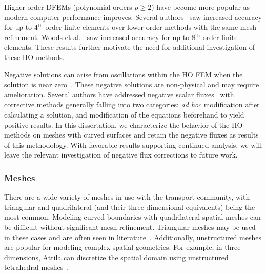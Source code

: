 \documentclass[12pt,letterpaper]{article}
\begin{document}
Higher order DFEMs (polynomial orders $p \geq 2$) have become more popular as modern computer performance improves. Several authors~\cite{WangRagusaDSA, WangHODGTransport, WangDGFEMConvergence, WangDissertation} saw increased accuracy for up to 4$^\text{th}$-order finite elements over lower-order methods with the same mesh refinement. Woods et al.~\cite{WoodsHoDgfemXyCurved} saw increased accuracy for up to 8$^\text{th}$-order finite elements. These results further motivate the need for additional investigation of these HO methods.

Negative solutions can arise from oscillations within the HO FEM when the solution is near zero~\cite{WoodsThesis,WoodsHoDgfemXyCurved}. These negative solutions are non-physical and may require amelioration. Several authors have addressed negative scalar fluxes~\cite{HamiltonNegativeFluxFixups, Adams_Disc_FEM_Thick_Diff, MaginotNonNegative, MaginotLumpingDFEM, BrunnerPreservingPositivity} with corrective methods generally falling into two categories: \emph{ad hoc} modification after calculating a solution, and modification of the equations beforehand to yield positive results. In this dissertation, we characterize the behavior of the HO methods on meshes with curved surfaces and retain the negative fluxes as results of this methodology. With favorable results supporting continued analysis, we will leave the relevant investigation of negative flux corrections to future work.



\subsubsection{Meshes}
There are a wide variety of meshes in use with the transport community, with triangular and quadrilateral (and their three-dimensional equivalents) being the most common. Modeling curved boundaries with quadrilateral spatial meshes can be difficult without significant mesh refinement. Triangular meshes may be used in these cases and are often seen in literature~\cite{ReedTriangularMesh,WangHODGTransport,WangDGFEMConvergence, MorelLLDrz}. Additionally, unstructured meshes are popular for modeling complex spatial geometries. For example, in three-dimensions, Attila can discretize the spatial domain using unstructured tetrahedral meshes~\cite{WareingAttila}.
\end{document}
